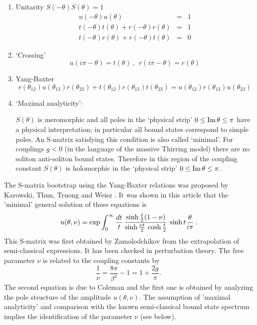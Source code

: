 \documentclass[a4paper,12pt]{article}
\def\func#1{\mathop{\rm #1}}%
\begin{document}
\begin{enumerate}
\item  {Unitarity} $S(-\theta )S(\theta )=1$ 
\begin{eqnarray*}
u(-\theta )u(\theta ) &=&1 \\
t(-\theta )t(\theta )+r(-\theta )r(\theta ) &=&1 \\
t(-\theta )r(\theta )+r(-\theta )t(\theta ) &=&0
\end{eqnarray*}

\item  {`Crossing'} 
\[
u(i\pi -\theta )=t(\theta )~,~~r(i\pi -\theta )=r(\theta ) 
\]

\item  {Yang-Baxter} 
\[
r(\theta _{12})u(\theta _{13})r(\theta _{23})+t(\theta _{12})r(\theta
_{13})t(\theta _{23})=u(\theta _{12})r(\theta _{13})u(\theta _{23}) 
\]

\item  `Maximal analyticity':

$S(\theta )$ is meromorphic and all poles in the `physical strip' $0\leq 
\func{Im}\theta \leq \pi $ have a physical interpretation; in particular all
bound states correspond to simple poles. An S-matrix satisfying this
condition is also called `minimal'. For couplings $g<0$ (in the language of
the massive Thirring model) there are no soliton anti-soliton bound states.
Therefore in this region of the coupling constant $S(\theta )$ is
holomorphic in the `physical strip' $0\leq \func{Im}\theta \leq \pi $.
\end{enumerate}

The S-matrix bootstrap using the {Yang-Baxter} relations was proposed by
Karowski, Thun, Truong and Weisz \cite{KTTW}. It was shown in this article
that the 'minimal' {general solution} of these equations is 
\[
u(\theta ,\nu )=\exp \int_{0}^{\infty }\frac{dt}{t}\,\frac{\sinh \frac{t}{2}%
(1-\nu )}{\sinh \frac{\nu t}{2}\,\cosh \frac{t}{2}}\,\sinh t\frac{\theta }{%
i\pi }\,. 
\]
This S-matrix was first obtained by Zamolodchikov \cite{Za} from the
extrapolation of semi-classical expressions. It has been checked in
perturbation theory. The free parameter $\nu $ is related to the coupling
constants by 
\[
\frac{1}{\nu }=\frac{8\pi }{\beta ^{2}}-1=1+\frac{2g}{\pi }\,. 
\]
The second equation is due to Coleman and the first one is obtained by
analyzing the pole structure of the amplitude $u(\theta ,\nu )$. The
assumption of 'maximal analyticity' and comparison with the known
semi-classical bound state spectrum implies the identification of the
parameter $\nu $ (see below).
\end{document}
